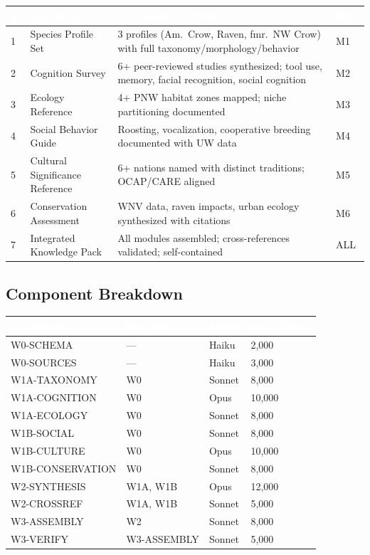 \documentclass[11pt,letterpaper]{article}
\newcommand{\tableheader}[1]{\textbf{\sffamily\textcolor{white}{#1}}}
\begin{document}
\begin{center}
\begin{tabularx}{\textwidth}{C{0.5cm}L{3.5cm}XC{2cm}}
\toprule
{}
\tableheader{\#} & \tableheader{Deliverable} & \tableheader{Acceptance Criteria} & \tableheader{Spec} \\
 & Species Profile Set & 3 profiles (Am.\ Crow, Raven, fmr.\ NW Crow) with full taxonomy/morphology/behavior & M1 \\
2 & Cognition Survey & 6+ peer-reviewed studies synthesized; tool use, memory, facial recognition, social cognition & M2 \\
3 & Ecology Reference & 4+ PNW habitat zones mapped; niche partitioning documented & M3 \\
4 & Social Behavior Guide & Roosting, vocalization, cooperative breeding documented with UW data & M4 \\
5 & Cultural Significance Reference & 6+ nations named with distinct traditions; OCAP\textregistered{}/CARE aligned & M5 \\
6 & Conservation Assessment & WNV data, raven impacts, urban ecology synthesized with citations & M6 \\
7 & Integrated Knowledge Pack & All modules assembled; cross-references validated; self-contained & ALL \\
\bottomrule
\end{tabularx}
\end{center}

\subsection{Component Breakdown}

\begin{center}
\begin{tabularx}{\textwidth}{L{3.5cm}C{1.5cm}C{1.5cm}C{2cm}}
\toprule
{}
\tableheader{Component} & \tableheader{Depends On} & \tableheader{Model} & \tableheader{Est.\ Tokens} \\
\midrule
W0-SCHEMA & --- & Haiku & 2,000 \\
W0-SOURCES & --- & Haiku & 3,000 \\
W1A-TAXONOMY & W0 & Sonnet & 8,000 \\
W1A-COGNITION & W0 & Opus & 10,000 \\
W1A-ECOLOGY & W0 & Sonnet & 8,000 \\
W1B-SOCIAL & W0 & Sonnet & 8,000 \\
W1B-CULTURE & W0 & Opus & 10,000 \\
W1B-CONSERVATION & W0 & Sonnet & 8,000 \\
W2-SYNTHESIS & W1A, W1B & Opus & 12,000 \\
W2-CROSSREF & W1A, W1B & Sonnet & 5,000 \\
W3-ASSEMBLY & W2 & Sonnet & 8,000 \\
W3-VERIFY & W3-ASSEMBLY & Sonnet & 5,000 \\
\bottomrule
\end{tabularx}
\end{center}
\end{document}
